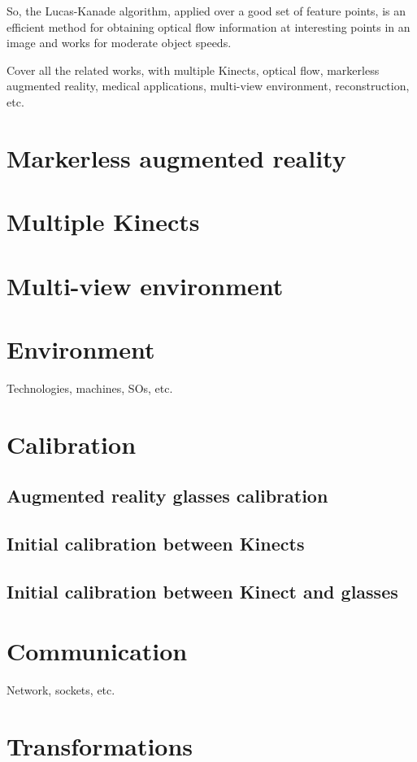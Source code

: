 \documentclass[msc, a4paper, classic, en]{ufbathesis}
\begin{document}
So, the Lucas-Kanade algorithm, applied over a good set of feature points, is an efficient method for obtaining optical flow information at interesting points in an image and works for moderate object speeds.

Cover all the related works, with multiple Kinects, optical flow, markerless augmented reality, medical applications, multi-view environment, reconstruction, etc.
\section{Markerless augmented reality}
\section{Multiple Kinects}
\section{Multi-view environment}

\section{Environment}
Technologies, machines, SOs, etc.
\section{Calibration}
\subsection{Augmented reality glasses calibration}
\subsection{Initial calibration between Kinects}
\subsection{Initial calibration between Kinect and glasses}
\section{Communication}
Network, sockets, etc.
\section{Transformations}
\end{document}
